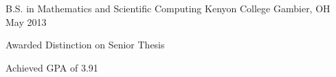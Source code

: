 \begin{cventries}
  \cventry
    {B.S. in Mathematics and Scientific Computing}
    {Kenyon College}
    {Gambier, OH}
    {May 2013}
    {
      \begin{cvitems}
        \item {Awarded Distinction on Senior Thesis}
        \item {Achieved GPA of 3.91}
      \end{cvitems}
    }
\end{cventries}
